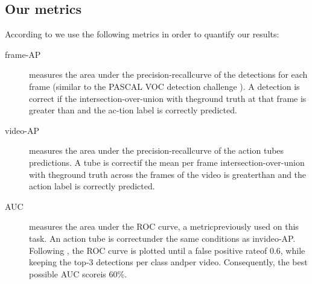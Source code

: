 \documentclass{article}
\begin{document}
\subsection{Our metrics}
According to \cite{DBLP:journals/corr/GkioxariM14} we use the following metrics in order to quantify our results:
\begin{description}
\item[ frame-AP ] measures the area under the precision-recallcurve of the detections for each frame (similar to the PASCAL  VOC  detection  challenge  \cite{Everingham10}).   A  detection is correct
  if the intersection-over-union with theground truth at that frame is greater than and the ac-tion label is correctly predicted.
\item [ video-AP ] measures the area under the precision-recallcurve of the action tubes predictions. A tube is correctif the mean per frame intersection-over-union with theground truth across the
  frames of the video is greaterthan and the action label is correctly predicted.
\item [ AUC ] measures the area under the ROC curve, a metricpreviously used on this task.  An action tube is correctunder the same conditions as invideo-AP. Following
  \cite{Tian:2013:SDP:2514950.2515975} , the ROC curve is plotted until a false positive rateof 0.6, while keeping the top-3 detections per class andper video. Consequently,
  the best possible AUC scoreis 60\%.
\end{description}


\end{document}
